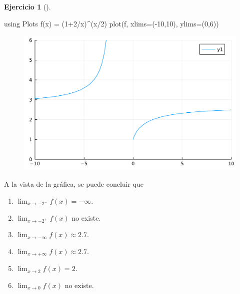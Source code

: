 \documentclass[
  a4paper,
]{scrreport}
\newenvironment{Shaded}{\begin{snugshade}}{\end{snugshade}}
\newcommand{\BuiltInTok}[1]{\textcolor[rgb]{0.00,0.23,0.31}{#1}}
\newcommand{\FloatTok}[1]{\textcolor[rgb]{0.68,0.00,0.00}{#1}}
\newcommand{\FunctionTok}[1]{\textcolor[rgb]{0.28,0.35,0.67}{#1}}
\newcommand{\ImportTok}[1]{\textcolor[rgb]{0.00,0.46,0.62}{#1}}
\newcommand{\NormalTok}[1]{\textcolor[rgb]{0.00,0.23,0.31}{#1}}
\newcommand{\OperatorTok}[1]{\textcolor[rgb]{0.37,0.37,0.37}{#1}}
\providecommand{\tightlist}{%
  \setlength{\itemsep}{0pt}\setlength{\parskip}{0pt}}\usepackage{longtable,booktabs,array}
\theoremstyle{definition}
\newtheorem{exercise}{Ejercicio}[chapter]
\theoremstyle{remark}
\begin{document}
\begin{exercise}[]
\begin{tcolorbox}
\begin{Shaded}
\begin{Highlighting}[]
\ImportTok{using} \BuiltInTok{Plots}
\FunctionTok{f}\NormalTok{(x) }\OperatorTok{=}\NormalTok{ (}\FloatTok{1}\OperatorTok{+}\FloatTok{2}\OperatorTok{/}\NormalTok{x)}\OperatorTok{\^{}}\NormalTok{(x}\OperatorTok{/}\FloatTok{2}\NormalTok{)}
\FunctionTok{plot}\NormalTok{(f, xlims}\OperatorTok{=}\NormalTok{(}\OperatorTok{{-}}\FloatTok{10}\NormalTok{,}\FloatTok{10}\NormalTok{), ylims}\OperatorTok{=}\NormalTok{(}\FloatTok{0}\NormalTok{,}\FloatTok{6}\NormalTok{))}
\end{Highlighting}
\end{Shaded}

\begin{figure}[H]

{\centering \includegraphics{./limites_files/figure-pdf/cell-10-output-1.pdf}

}

\end{figure}

A la vista de la gráfica, se puede concluir que

\begin{enumerate}
\def\labelenumi{\roman{enumi}.}
\tightlist
\item
  \(\lim_{x\rightarrow -2^-} f(x) = -\infty.\)
\item
  \(\lim_{x\rightarrow -2^+} f(x)\) no existe.
\item
  \(\lim_{x\rightarrow -\infty} f(x)\approx 2.7.\)
\item
  \(\lim_{x\rightarrow +\infty} f(x) \approx 2.7.\)
\item
  \(\lim_{x\rightarrow 2} f(x) = 2.\)
\item
  \(\lim_{x\rightarrow 0} f(x)\) no existe.
\end{enumerate}


\end{tcolorbox}
\end{exercise}
\end{document}
